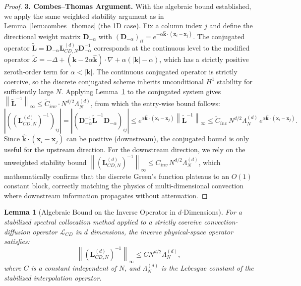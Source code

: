 \documentclass[pdflatex,sn-mathphys-num]{sn-jnl}%
\theoremstyle{thmstyleone}%
\newtheorem{lemma}{Lemma}
\newcommand{\norm}[1]{\left\lVert#1\right\rVert}
\newcommand{\mat}[1]{\mathbf{#1}}
\begin{document}
\begin{proof}
\noindent\textbf{3. Combes--Thomas Argument.}
With the algebraic bound established, we apply the same weighted stability argument as in Lemma~\ref{lem:combes_thomas} (the 1D case). Fix a column index $j$ and define the directional weight matrix $\mat{D}_{-\alpha}$ with $(\mat{D}_{-\alpha})_{ii} = e^{-\alpha \hat{\mathbf{k}} \cdot (\mathbf{x}_i - \mathbf{x}_j)}$. The conjugated operator $\widetilde{\mat{L}} = \mat{D}_{-\alpha} \mat{L}_{CD,N}^{(d)} \mat{D}_{-\alpha}^{-1}$ corresponds at the continuous level to the modified operator $\widetilde{\mathcal{L}} = -\Delta + (\mathbf{k} - 2\alpha\hat{\mathbf{k}}) \cdot \nabla + \alpha(|\mathbf{k}| - \alpha)$, which has a strictly positive zeroth-order term for $\alpha < |\mathbf{k}|$. The continuous conjugated operator is strictly coercive, so the discrete conjugated scheme inherits unconditional $H^1$ stability for sufficiently large $N$. Applying Lemma~\ref{lem:algebraic_bound_d_dim} to the conjugated system gives $\norm{\widetilde{\mat{L}}^{-1}}_\infty \le \tilde{C}_{inv} \cdot N^{d/2} \Lambda_N^{(d)}$, from which the entry-wise bound follows:
\begin{equation} |((\mat{L}_{CD,N}^{(d)})^{-1})_{ij}| = |(\mat{D}_{-\alpha}^{-1} \widetilde{\mat{L}}^{-1} \mat{D}_{-\alpha})_{ij}| \le e^{\alpha \hat{\mathbf{k}} \cdot (\mathbf{x}_i - \mathbf{x}_j)} \norm{\widetilde{\mat{L}}^{-1}}_\infty \le \tilde{C}_{inv}\, N^{d/2} \Lambda_N^{(d)}\, e^{\alpha \hat{\mathbf{k}} \cdot (\mathbf{x}_i - \mathbf{x}_j)}. \end{equation}
Since $\hat{\mathbf{k}} \cdot (\mathbf{x}_i - \mathbf{x}_j)$ can be positive (downstream), the conjugated bound is only useful for the upstream direction. For the downstream direction, we rely on the unweighted stability bound $\norm{(\mat{L}_{CD,N}^{(d)})^{-1}}_\infty \le C_{inv}\, N^{d/2} \Lambda_N^{(d)}$, which mathematically confirms that the discrete Green's function plateaus to an $O(1)$ constant block, correctly matching the physics of multi-dimensional convection where downstream information propagates without attenuation.
\end{proof}

\begin{lemma}[Algebraic Bound on the Inverse Operator in $d$-Dimensions]
\label{lem:algebraic_bound_d_dim}
For a stabilized spectral collocation method applied to a strictly coercive convection-diffusion operator $\mathcal{L}_{CD}$ in $d$ dimensions, the inverse physical-space operator satisfies:
\begin{equation} \norm{(\mat{L}_{CD,N}^{(d)})^{-1}}_\infty \le C N^{d/2} \Lambda_N^{(d)}, \end{equation}
where $C$ is a constant independent of $N$, and $\Lambda_N^{(d)}$ is the Lebesgue constant of the stabilized interpolation operator.
\end{lemma}
\end{document}
